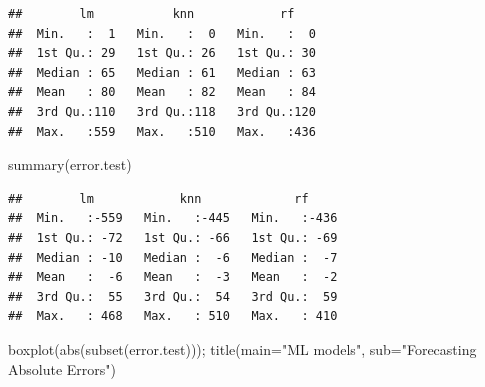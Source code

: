 \documentclass[
]{article}
\newenvironment{Shaded}{\begin{snugshade}}{\end{snugshade}}
\newcommand{\AttributeTok}[1]{\textcolor[rgb]{0.77,0.63,0.00}{#1}}
\newcommand{\CommentTok}[1]{\textcolor[rgb]{0.56,0.35,0.01}{\textit{#1}}}
\newcommand{\FunctionTok}[1]{\textcolor[rgb]{0.00,0.00,0.00}{#1}}
\newcommand{\NormalTok}[1]{#1}
\newcommand{\OtherTok}[1]{\textcolor[rgb]{0.56,0.35,0.01}{#1}}
\newcommand{\SpecialCharTok}[1]{\textcolor[rgb]{0.00,0.00,0.00}{#1}}
\newcommand{\StringTok}[1]{\textcolor[rgb]{0.31,0.60,0.02}{#1}}
\begin{document}
\begin{Shaded}
\end{Shaded}

\begin{verbatim}
##        lm           knn            rf     
##  Min.   :  1   Min.   :  0   Min.   :  0  
##  1st Qu.: 29   1st Qu.: 26   1st Qu.: 30  
##  Median : 65   Median : 61   Median : 63  
##  Mean   : 80   Mean   : 82   Mean   : 84  
##  3rd Qu.:110   3rd Qu.:118   3rd Qu.:120  
##  Max.   :559   Max.   :510   Max.   :436
\end{verbatim}

\begin{Shaded}
\begin{Highlighting}[]
\FunctionTok{summary}\NormalTok{(error.test)}
\end{Highlighting}
\end{Shaded}

\begin{verbatim}
##        lm            knn             rf      
##  Min.   :-559   Min.   :-445   Min.   :-436  
##  1st Qu.: -72   1st Qu.: -66   1st Qu.: -69  
##  Median : -10   Median :  -6   Median :  -7  
##  Mean   :  -6   Mean   :  -3   Mean   :  -2  
##  3rd Qu.:  55   3rd Qu.:  54   3rd Qu.:  59  
##  Max.   : 468   Max.   : 510   Max.   : 410
\end{verbatim}

\begin{Shaded}
\begin{Highlighting}[]
\FunctionTok{boxplot}\NormalTok{(}\FunctionTok{abs}\NormalTok{(}\FunctionTok{subset}\NormalTok{(error.test))); }\FunctionTok{title}\NormalTok{(}\AttributeTok{main=}\StringTok{"ML models"}\NormalTok{, }\AttributeTok{sub=}\StringTok{"Forecasting Absolute Errors"}\NormalTok{)}
\end{Highlighting}
\end{Shaded}
\end{document}

